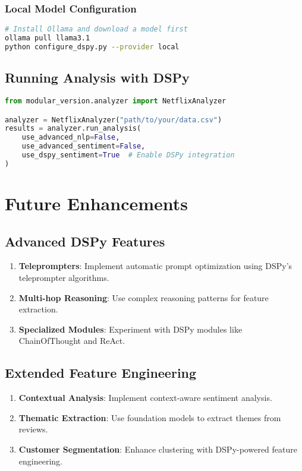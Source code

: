 \documentclass[11pt]{article}
\begin{document}
\subsubsection{Local Model Configuration}
\begin{lstlisting}[language=bash]
# Install Ollama and download a model first
ollama pull llama3.1
python configure_dspy.py --provider local
\end{lstlisting}

\subsection{Running Analysis with DSPy}

\begin{lstlisting}[language=Python]
from modular_version.analyzer import NetflixAnalyzer

analyzer = NetflixAnalyzer("path/to/your/data.csv")
results = analyzer.run_analysis(
    use_advanced_nlp=False,
    use_advanced_sentiment=False,
    use_dspy_sentiment=True  # Enable DSPy integration
)
\end{lstlisting}

\section{Future Enhancements}

\subsection{Advanced DSPy Features}

\begin{enumerate}
    \item \textbf{Teleprompters}: Implement automatic prompt optimization using DSPy's teleprompter algorithms.
    \item \textbf{Multi-hop Reasoning}: Use complex reasoning patterns for feature extraction.
    \item \textbf{Specialized Modules}: Experiment with DSPy modules like ChainOfThought and ReAct.
\end{enumerate}

\subsection{Extended Feature Engineering}

\begin{enumerate}
    \item \textbf{Contextual Analysis}: Implement context-aware sentiment analysis.
    \item \textbf{Thematic Extraction}: Use foundation models to extract themes from reviews.
    \item \textbf{Customer Segmentation}: Enhance clustering with DSPy-powered feature engineering.
\end{enumerate}
\end{document}
